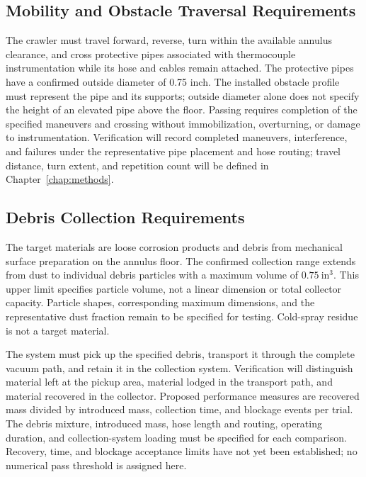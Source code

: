 \subsection{Mobility and Obstacle Traversal Requirements}
\label{sec:mobility-requirements}
The crawler must travel forward, reverse, turn within the available annulus clearance, and cross protective pipes associated with thermocouple instrumentation while its hose and cables remain attached. The protective pipes have a confirmed outside diameter of 0.75 inch. The installed obstacle profile must represent the pipe and its supports; outside diameter alone does not specify the height of an elevated pipe above the floor. Passing requires completion of the specified maneuvers and crossing without immobilization, overturning, or damage to instrumentation. Verification will record completed maneuvers, interference, and failures under the representative pipe placement and hose routing; travel distance, turn extent, and repetition count will be defined in Chapter~\ref{chap:methods}.

\subsection{Debris Collection Requirements}
\label{sec:collection-requirements}
The target materials are loose corrosion products and debris from mechanical surface preparation on the annulus floor. The confirmed collection range extends from dust to individual debris particles with a maximum volume of $0.75~\mathrm{in}^{3}$. This upper limit specifies particle volume, not a linear dimension or total collector capacity. Particle shapes, corresponding maximum dimensions, and the representative dust fraction remain to be specified for testing. Cold-spray residue is not a target material.

The system must pick up the specified debris, transport it through the complete vacuum path, and retain it in the collection system. Verification will distinguish material left at the pickup area, material lodged in the transport path, and material recovered in the collector. Proposed performance measures are recovered mass divided by introduced mass, collection time, and blockage events per trial. The debris mixture, introduced mass, hose length and routing, operating duration, and collection-system loading must be specified for each comparison. Recovery, time, and blockage acceptance limits have not yet been established; no numerical pass threshold is assigned here.

